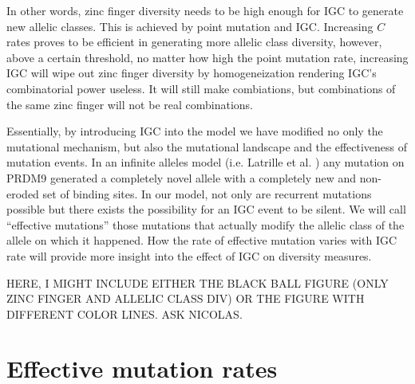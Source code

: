 \documentclass[a4paper,10pt]{article}
\begin{document}
 In other words, zinc finger diversity needs to be high enough for IGC to generate new allelic classes. This is achieved by point mutation and IGC. Increasing $C$ rates proves to be efficient in generating more allelic class diversity, however, above a certain threshold, no matter how high the point mutation rate, increasing IGC will wipe out zinc finger diversity by homogeneization rendering IGC's combinatorial power useless. It will still make combiations, but combinations of the same zinc finger will not be real combinations. 
 
Essentially, by introducing IGC into the model we have modified no only the mutational mechanism, but also the mutational landscape and the effectiveness of mutation events. In an infinite alleles model (i.e. Latrille et al. \cite{Latrille2017}) any mutation on PRDM9 generated a completely novel allele with a completely new and non-eroded set of binding sites. In our model, not only are recurrent mutations possible but there exists the possibility for an IGC event to be silent. We will call ``effective mutations'' those mutations that actually modify the allelic class of the allele on which it happened. How the rate of effective mutation varies with IGC rate will provide more insight into the effect of IGC on diversity measures. 

HERE, I MIGHT INCLUDE EITHER THE BLACK BALL FIGURE (ONLY ZINC FINGER AND ALLELIC CLASS DIV) OR THE FIGURE WITH DIFFERENT COLOR LINES. ASK NICOLAS.
 
 
 
\section{Effective mutation rates}
\end{document}
